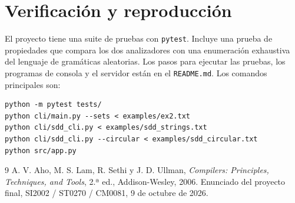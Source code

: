 \documentclass[11pt,a4paper]{article}
\begin{document}
\section{Verificación y reproducción}
El proyecto tiene una suite de pruebas con \texttt{pytest}. Incluye una prueba de propiedades que compara los dos analizadores con una enumeración exhaustiva del lenguaje de gramáticas aleatorias. Los pasos para ejecutar las pruebas, los programas de consola y el servidor están en el \texttt{README.md}. Los comandos principales son:
\begin{small}
\begin{verbatim}
python -m pytest tests/
python cli/main.py --sets < examples/ex2.txt
python cli/sdd_cli.py < examples/sdd_strings.txt
python cli/sdd_cli.py --circular < examples/sdd_circular.txt
python src/app.py
\end{verbatim}
\end{small}

\begin{thebibliography}{9}
 A. V. Aho, M. S. Lam, R. Sethi y J. D. Ullman, \emph{Compilers: Principles, Techniques, and Tools}, 2.ª ed., Addison-Wesley, 2006.
 Enunciado del proyecto final, SI2002 / ST0270 / CM0081, 9 de octubre de 2026.
\end{thebibliography}
\end{document}
